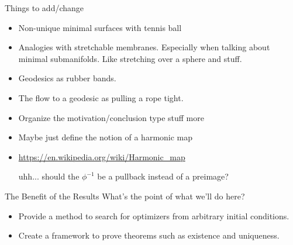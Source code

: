 \documentclass[usenames,dvipsnames]{beamer}
\theoremstyle{definition}
\newtheorem*{question}{Question}
\theoremstyle{theorem}
\begin{document}


\begin{frame}{Things to add/change}
\begin{itemize}
    \item Non-unique minimal surfaces with tennis ball
    \item Analogies with stretchable membranes. Especially when talking about minimal submanifolds.  Like stretching over a sphere and stuff. 
    \item Geodesics as rubber bands.
    \item The flow to a geodesic as pulling a rope tight.
    \item Organize the motivation/conclusion type stuff more
    \item Maybe just define the notion of a harmonic map
    \item 
    \url{https://en.wikipedia.org/wiki/Harmonic_map}
        
        uhh... should the $\phi^{-1}$ be a pullback instead of a preimage?
\end{itemize}
\end{frame}

      \begin{frame}{The Benefit of the Results}
            What's the point of what we'll do here?
            \begin{itemize}
                \item Provide a method to search for optimizers from arbitrary initial conditions.
                \item Create a framework to prove theorems such as existence and uniqueness.
            \end{itemize}
        \end{frame}
    
        
\end{document}

